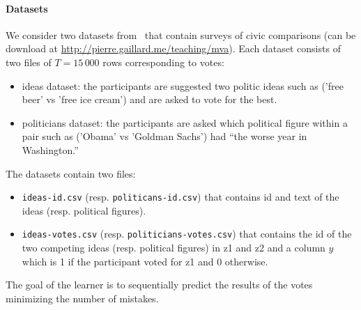 	\paragraph{Datasets} We consider two datasets from~\cite{salganik2015wiki} that contain surveys of civic comparisons (can be download at \url{http://pierre.gaillard.me/teaching/mva}). Each dataset consists of two files of $T=15\,000$ rows corresponding to votes:
	\begin{itemize}
		\item ideas dataset: the participants are suggested two politic ideas such as ('free beer' vs 'free ice cream') and are asked to vote for the best. 
		\item politicians dataset: the participants are asked  which political figure within a pair such as ('Obama' vs 'Goldman Sachs') had ``the worse year in Washington.''
	\end{itemize}
	The datasets contain two files: 
	\begin{itemize}
		\item \texttt{ideas-id.csv} (resp. \texttt{politicans-id.csv}) that contains id and text of the ideas (resp. political figures). 
		\item \texttt{ideas-votes.csv} (resp. \texttt{politicians-votes.csv}) that contains the id of the two competing ideas (resp. political figures) in z1 and z2 and a column $y$ which is 1 if the participant voted for z1 and 0 otherwise.
	\end{itemize}
	The goal of the learner is to sequentially predict the results of the votes minimizing the number of mistakes.

